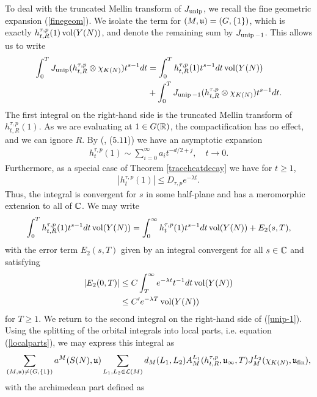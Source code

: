 To deal with the truncated Mellin transform of $J_{\operatorname{unip}}$, we recall the fine geometric expansion (\ref{finegeom}). We isolate the term for $(M,\mathfrak{u})=(G,\lbrace 1\rbrace)$, which is exactly $h^{\tau,p}_{t,R}(1)\operatorname{vol}(Y(N))$, and denote the remaining sum by $J_{\operatorname{unip}-1}$. This allows us to write
\begin{align}\label{unip-1}
    \int_0^T J_{\operatorname{unip}}(h^{\tau,p}_{t,R}\otimes\chi_{K(N)})t^{s-1}dt &= \int_0^T h_{t,R}^{\tau,p}(1)t^{s-1}dt \operatorname{vol}(Y(N)) \\
    &+\int_0^T J_{\operatorname{unip}-1}(h^{\tau,p}_{t,R}\otimes\chi_{K(N)})t^{s-1}dt .
\end{align}
The first integral on the right-hand side is the truncated Mellin transform of $h_{t,R}^{\tau,p}(1)$. As we are evaluating at $1\in G(\mathbb{R})$, the compactification has no effect, and we can ignore $R$. By (\cite{MzM1}, ($5.11$)) we have an asymptotic expansion
\begin{align*}
    h_t^{\tau,p}(1)\sim \sum_{i=0}^\infty a_i t^{-d/2+j}, \quad t\to 0.
\end{align*}
Furthermore, as a special case of Theorem \ref{traceheatdecay} we have for $t\geq 1$,
\begin{align*}
    |h_t^{\tau,p}(1)|\leq D_{\tau,p}e^{-\lambda t}.
\end{align*}
Thus, the integral is convergent for $s$ in some half-plane and has a meromorphic extension to all of $\mathbb{C}$. We may write
\begin{align*}
    \int_0^T h_{t,R}^{\tau,p}(1)t^{s-1}dt \operatorname{vol}(Y(N)) = \int_0^\infty h_t^{\tau,p}(1)t^{s-1}dt \operatorname{vol}(Y(N)) + E_2(s,T),
\end{align*}
with the error term $E_2(s,T)$ given by an integral convergent for all $s\in\mathbb{C}$ and satisfying
\begin{align}\label{error2}
    |E_2(0,T)|&\leq C\int_T^\infty e^{-\lambda t}t^{-1}dt \operatorname{vol}(Y(N)) \\
    &\leq C'e^{-\lambda T}\operatorname{vol}(Y(N))
\end{align}
for $T\geq 1$. We return to the second integral on the right-hand side of (\ref{unip-1}). Using the splitting of the orbital integrals into local parts, i.e. equation (\ref{localparts}), we may express this integral as
\begin{align}\label{expansioncalc}
    \sum_{(M,\mathfrak{u})\neq(G,\lbrace 1\rbrace)}a^M(S(N),\mathfrak{u})\sum_{L_1,L_2\in \mathcal{L}(M)}d_M(L_1,L_2)A_M^{L_1}(h^{\tau,p}_{t,R},\mathfrak{u}_\infty,T)J_M^{L_2}(\chi_{K(N)},\mathfrak{u}_{\text{fin}}),
\end{align}
with the archimedean part defined as 
